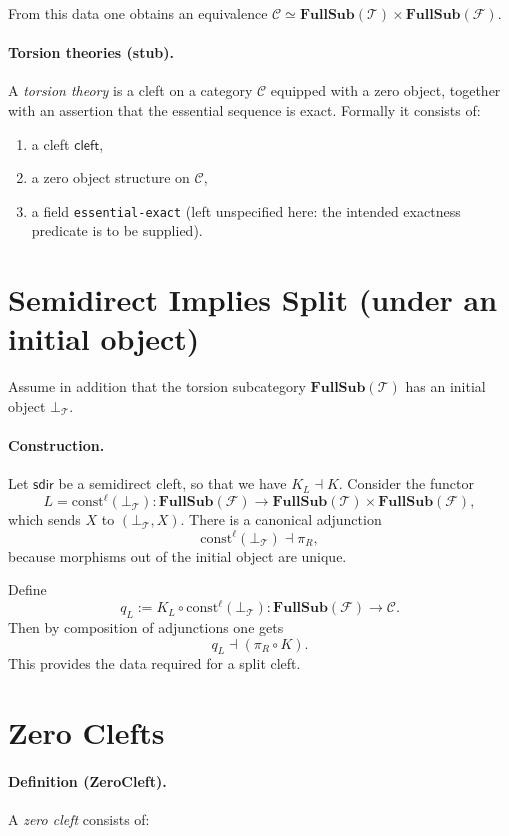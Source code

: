 \documentclass[11pt]{article}
\newcommand{\FS}[1]{\mathbf{FullSub}(#1)} %
\newcommand{\Prod}{\times}
\begin{document}
From this data one obtains an equivalence
$\mathcal{C} \simeq \FS{\mathcal{T}}\Prod\FS{\mathcal{F}}$.

\paragraph{Torsion theories (stub).}
A \emph{torsion theory} is a cleft on a category $\mathcal{C}$ equipped with a zero object,
together with an assertion that the essential sequence is exact.
Formally it consists of:

\begin{enumerate}
\item a cleft $\mathsf{cleft}$,
\item a zero object structure on $\mathcal{C}$,
\item a field \texttt{essential-exact} (left unspecified here: the intended exactness predicate is to be supplied).
\end{enumerate}

\section*{Semidirect Implies Split (under an initial object)}

Assume in addition that the torsion subcategory $\FS{\mathcal{T}}$ has an initial object $\bot_{\mathcal{T}}$.

\paragraph{Construction.}
Let $\mathsf{sdir}$ be a semidirect cleft, so that we have $K_L \dashv K$.
Consider the functor
\[
  L = \mathrm{const}^\ell(\bot_{\mathcal{T}}) : \FS{\mathcal{F}} \to \FS{\mathcal{T}}\Prod\FS{\mathcal{F}},
\]
which sends $X$ to $(\bot_{\mathcal{T}},X)$.
There is a canonical adjunction
\[
  \mathrm{const}^\ell(\bot_{\mathcal{T}}) \dashv \pi_R,
\]
because morphisms out of the initial object are unique.

Define
\[
  q_L := K_L \circ \mathrm{const}^\ell(\bot_{\mathcal{T}}) : \FS{\mathcal{F}} \to \mathcal{C}.
\]
Then by composition of adjunctions one gets
\[
  q_L \dashv (\pi_R \circ K).
\]
This provides the data required for a split cleft.

\section*{Zero Clefts}

\paragraph{Definition (ZeroCleft).}
A \emph{zero cleft} consists of:
\end{document}
